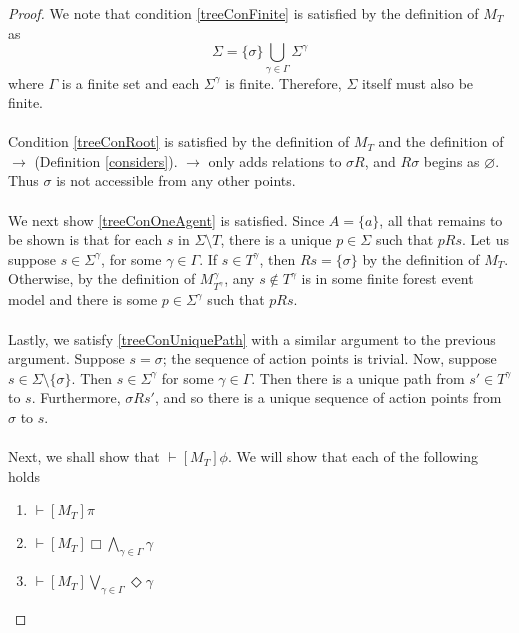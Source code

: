 \documentclass[12pt, a4paper, titlepage]{scrartcl}
\numberwithin{equation}{section}
\newcommand{\sqex}[1]{[{#1}]}
\begin{document}
\begin{proof}
We note that condition \ref{treeConFinite} is satisfied by the definition of $M_T$ as
\[\Sigma = \{\sigma\} \bigcup_{\gamma \in \Gamma} \Sigma^{\gamma}\]
where $\Gamma$ is a finite set and each $\Sigma^\gamma$ is finite.
Therefore, $\Sigma$ itself must also be finite.\\
\\
Condition \ref{treeConRoot} is satisfied by the definition of $M_T$ and the definition of $\to$
(Definition \ref{considers}).
$\to$ only adds relations to $\sigma R$, and $R \sigma$ begins as $\varnothing$.
Thus $\sigma$ is not accessible from any other points.\\
\\
We next show \ref{treeConOneAgent} is satisfied.
Since $A = \{a\}$, all that remains to be shown is that for each $s$ in $\Sigma \setminus T$, there is a unique
$p \in \Sigma$ such that $p R s$.
Let us suppose $s \in \Sigma^\gamma$, for some $\gamma \in \Gamma$.
If $s \in T^\gamma$, then $R s = \{ \sigma \}$ by the definition of $M_T$.
Otherwise, by the definition of $M^\gamma_{T^\gamma}$, any $s \notin T^\gamma$ is in some finite
forest event model and there is some $p \in \Sigma^\gamma$ such that $p R s$.\\
\\
Lastly, we satisfy \ref{treeConUniquePath} with a similar argument to the previous argument.
Suppose $s = \sigma$; the sequence of action points is trivial.
Now, suppose $s \in \Sigma \setminus \{ \sigma \}$.
Then $s \in \Sigma^\gamma$ for some $\gamma \in \Gamma$.
Then there is a unique path from $s' \in T^\gamma$ to $s$.
Furthermore, $\sigma R s'$, and so there is a unique sequence of action points from $\sigma$ to $s$.\\
\\
Next, we shall show that $\vdash \sqex{M_T} \phi$.
We will show that each of the following holds
\begin{enumerate}
	\item $\vdash \sqex{M_T} \pi$
	\item $\vdash \sqex{M_T} \Box \bigwedge_{\gamma \in \Gamma} \gamma$
	\item $\vdash \sqex{M_T} \bigvee_{\gamma \in \Gamma} \Diamond \gamma$
\end{enumerate}


\end{proof}
\end{document}
